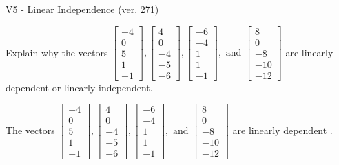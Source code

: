 \begin{exercise}
  \begin{exerciseTitle}V5 - Linear Independence (ver. 271)\end{exerciseTitle}
  \begin{exerciseStatement}
    Explain why the vectors \(\left[\begin{array}{r}
-4 \\
0 \\
5 \\
1 \\
-1
\end{array}\right] , \left[\begin{array}{r}
4 \\
0 \\
-4 \\
-5 \\
-6
\end{array}\right] , \left[\begin{array}{r}
-6 \\
-4 \\
1 \\
1 \\
-1
\end{array}\right] , \text{ and } \left[\begin{array}{r}
8 \\
0 \\
-8 \\
-10 \\
-12
\end{array}\right]\) are linearly dependent or linearly independent.	


  \end{exerciseStatement}
  \begin{exerciseAnswer}
   The vectors \(\left[\begin{array}{r}
-4 \\
0 \\
5 \\
1 \\
-1
\end{array}\right] , \left[\begin{array}{r}
4 \\
0 \\
-4 \\
-5 \\
-6
\end{array}\right] , \left[\begin{array}{r}
-6 \\
-4 \\
1 \\
1 \\
-1
\end{array}\right] , \text{ and } \left[\begin{array}{r}
8 \\
0 \\
-8 \\
-10 \\
-12
\end{array}\right]\) are 
  	 linearly dependent  .
  


  \end{exerciseAnswer}
\end{exercise}